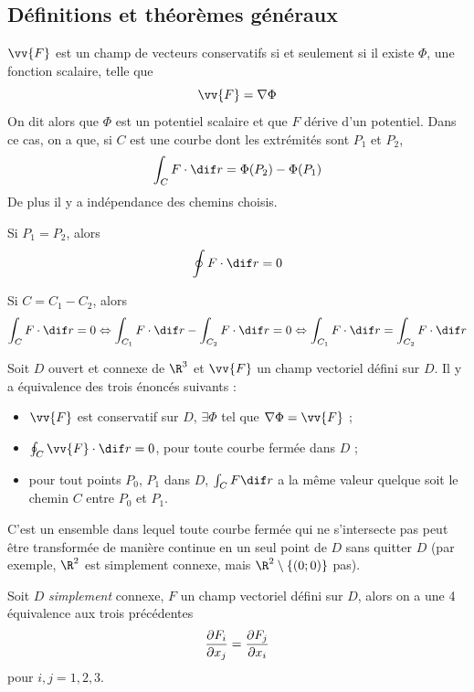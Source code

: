 \subsection{Définitions et théorèmes généraux}

\begin{mydef} $\vv{F}$ est un champ de vecteurs conservatifs si et seulement si il existe $\Phi$, une fonction scalaire, telle que
	\[ \vv{F} = \nabla \Phi \]
	On dit alors que $\Phi$ est un potentiel scalaire et que $F$ dérive d'un potentiel.
	Dans ce cas, on a que, si $C$ est une courbe dont les extrémités sont $P_1$ et $P_2$,
	\[ \int_C F \cdot \dif r = \Phi(P_2) - \Phi(P_1) \]
	De plus il y a indépendance des chemins choisis.
\end{mydef}

\begin{myprop}
	Si $P_1 = P_2$, alors
	\[ \oint F \cdot \dif r = 0 \]

	Si $C = C_1 - C_2$, alors
	\[ \int_C F \cdot \dif r = 0 \Leftrightarrow \int_{C_1} F \cdot \dif r - \int_{C_2} F \cdot \dif r = 0
	\Leftrightarrow \int_{C_1} F \cdot \dif r = \int_{C_2} F \cdot \dif r \]
\end{myprop}

\begin{mytheo} Soit $D$ ouvert et connexe de $\R^3$ et $\vv{F}$ un champ vectoriel défini sur $D$. Il y a équivalence des trois énoncés suivants :
	\begin{itemize}
		\item $\vv{F}$ est conservatif sur $D$, $\exists \Phi$ tel que $\nabla \Phi = \vv{F}$ ;
		\item $\oint_C \vv{F} \cdot \dif r = 0$, pour toute courbe fermée dans $D$ ;
		\item pour tout points $P_0$, $P_1$ dans $D$, $\int_C F \dif r$ a la même valeur quelque soit le chemin $C$ entre $P_0$ et $P_1$.
	\end{itemize}
\end{mytheo}

\begin{mydef} C'est un ensemble dans lequel toute courbe fermée qui ne s'intersecte pas peut être transformée de manière continue en un seul point de $D$ sans quitter $D$ (par exemple, $\R^2$ est simplement connexe, mais $\R^2 \setminus \{(0;0)\}$ pas).
\end{mydef}

\begin{mytheo} Soit $D$ \emph{simplement} connexe, $F$ un champ vectoriel défini sur $D$, alors on a une 4\ieme{} équivalence aux trois précédentes
	\[ \frac{\partial F_i}{\partial x_j} = \frac{\partial F_j}{\partial x_i} \]
	pour $i,j = 1,2,3$.
\end{mytheo}

